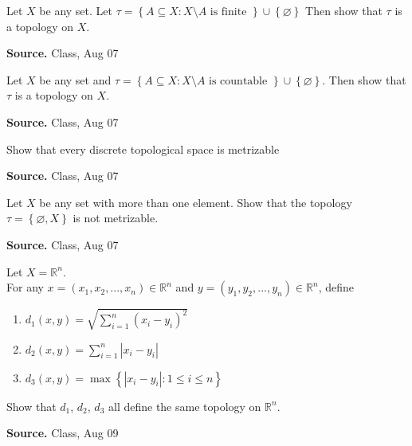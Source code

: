 \documentclass[12pt,twoside]{report}
\newenvironment*{source}{\hfill\scriptsize\textbf{Source.}\space}{\par}
\begin{document}
\begin{samepage}
\begin{ex}
Let $X$ be any set. Let 
$\tau = \left\{ A \subseteq X  :  X \setminus A \text{ is finite } \right\} \cup \left\{ \varnothing \right\} $
Then show that $\tau$ is a topology on $X$.
\end{ex}
\begin{source}
Class, Aug 07
\end{source}
\end{samepage}

\begin{samepage}
\begin{ex}
Let $X$ be any set and 
$\tau = \left\{ A \subseteq X  :  X \setminus A \text{ is countable } \right\} \cup \left\{ \varnothing \right\} $.
Then show that $\tau$ is a topology on $X$.
\end{ex}
\begin{source}
Class, Aug 07
\end{source}
\end{samepage}

\begin{samepage}
\begin{ex}
Show that every discrete topological space is metrizable
\end{ex}
\begin{source}
Class, Aug 07
\end{source}
\end{samepage}

\begin{samepage}
\begin{ex}
Let $X$ be any set with more than one element. 
Show that the topology $\tau = \left\{ \varnothing, X \right\}$ is not metrizable.
\end{ex}
\begin{source}
Class, Aug 07
\end{source}
\end{samepage}

\begin{samepage}
\begin{ex}
Let $X = \mathbb{R} ^n$. \\
For any $x = \left (x_1, x_2, ..., x_n\right ) \in \mathbb{R} ^n$ and 
$y = \left (y_1, y_2, ..., y_n\right ) \in \mathbb{R} ^n$, define 
\begin{enumerate}
    \item $ d_1 \left (x,y\right ) = \sqrt { \sum_{i = 1}^n \left (x_i - y_i\right ) ^2 } $
    \item $ d_2 \left (x,y\right ) = \sum_{i = 1}^n |x_i - y_i| $
    \item $ d_3 \left (x,y\right ) = \displaystyle\max \left\{ | x_i - y_i |  :  1 \leq i \leq n \right\} $
\end{enumerate}
Show that $d_1$, $d_2$, $d_3$ all define the same topology on $\mathbb{R} ^n$.
\end{ex}
\begin{source}
Class, Aug 09
\end{source}
\end{samepage}
\end{document}
